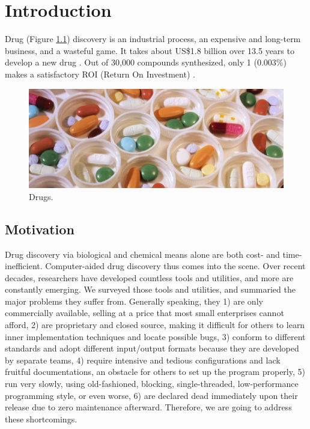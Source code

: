 \chapter{Introduction}

Drug (Figure \ref{Background:Drugs}) discovery is an industrial process, an expensive and long-term business, and a wasteful game. It takes about US\$1.8 billion over 13.5 years to develop a new drug \citep{716}. Out of 30,000 compounds synthesized, only 1 (0.003\%) makes a satisfactory ROI (Return On Investment) \citep{713}.

\begin{figure}
\centering
\includegraphics[width=\textwidth]{Background/Drugs.jpg}
\caption{Drugs.}
\label{Background:Drugs}
\end{figure}

\section{Motivation}

Drug discovery via biological and chemical means alone are both cost- and time-inefficient. Computer-aided drug discovery thus comes into the scene. Over recent decades, researchers have developed countless tools and utilities, and more are constantly emerging. We surveyed those tools and utilities, and summaried the major problems they suffer from. Generally speaking, they 1) are only commercially available, selling at a price that most small enterprises cannot afford, 2) are proprietary and closed source, making it difficult for others to learn inner implementation techniques and locate possible bugs, 3) conform to different standards and adopt different input/output formats because they are developed by separate teams, 4) require intensive and tedious configurations and lack fruitful documentations, an obstacle for others to set up the program properly, 5) run very slowly, using old-fashioned, blocking, single-threaded, low-performance programming style, or even worse, 6) are declared dead immediately upon their release due to zero maintenance afterward. Therefore, we are going to address these shortcomings.

